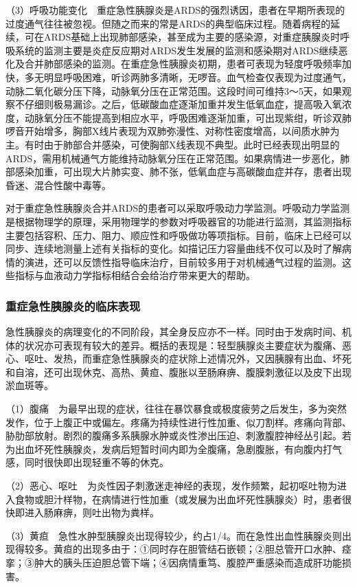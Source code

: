 （3）呼吸功能变化　重症急性胰腺炎是ARDS的强烈诱因，患者在早期所表现的过度通气往往被忽视。但随之而来的常是ARDS的典型临床过程。随着病程的延续，可在ARDS基础上出现肺部感染，甚至成为主要的感染源，对重症胰腺炎时呼吸系统的监测主要是炎症反应期对ARDS发生发展的监测和感染期对ARDS继续恶化及合并肺部感染的监测。在重症急性胰腺炎初期，患者可表现为轻度呼吸频率加快，多无明显呼吸困难，听诊两肺多清晰，无啰音。血气检查仅表现为过度通气，动脉二氧化碳分压下降，动脉氧分压在正常范围。这段时间可维持3～5天，如果观察不仔细则极易漏诊。之后，低碳酸血症逐渐加重并发生低氧血症，提高吸入氧浓度，动脉氧分压不能提高到相应水平，呼吸困难逐渐加重，可出现紫绀，听诊双肺啰音开始增多，胸部X线片表现为双肺弥漫性、对称性密度增高，以间质水肿为主。有时由于肺部合并感染，可使胸部X线表现不典型。此时已经表现出明显的ARDS，需用机械通气方能维持动脉氧分压在正常范围。如果病情进一步恶化，肺部感染加重，可出现大片肺实变、肺不张，低氧血症与高碳酸血症并存，患者出现昏迷、混合性酸中毒等。

对于重症急性胰腺炎合并ARDS的患者可以采取呼吸动力学监测。呼吸动力学监测是根据物理学的原理，采用物理学的参数对呼吸器官的功能进行监测，其监测指标主要包括容积、压力、阻力、顺应性和呼吸做功等项指标。目前，临床上已经可以同步、连续地测量上述有关指标的变化。如描记压力容量曲线不仅可以及时了解病情的演进，还可以反馈性指导临床治疗，目前较多用于对机械通气过程的监测。这些指标与血液动力学指标相结合会给治疗带来更大的帮助。

\subsubsection{重症急性胰腺炎的临床表现}

急性胰腺炎的病理变化的不同阶段，其全身反应亦不一样。同时由于发病时间、机体的状况亦可表现有较大的差异。概括的表现是：轻型胰腺炎主要症状为腹痛、恶心、呕吐、发热，而重症急性胰腺炎的症状除上述情况外，又因胰腺有出血、坏死和自溶，还可出现休克、高热、黄疸、腹胀以至肠麻痹、腹膜刺激征以及皮下出现淤血斑等。

（1）腹痛　为最早出现的症状，往往在暴饮暴食或极度疲劳之后发生，多为突然发作，位于上腹正中或偏左。疼痛为持续性进行性加重、似刀割样。疼痛向背部、胁肋部放射。剧烈的腹痛多系胰腺水肿或炎性渗出压迫、刺激腹腔神经丛引起。若为出血坏死性胰腺炎，发病后短暂时间内即为全腹痛，急剧腹胀，有向腹内打气感，同时很快即出现轻重不等的休克。

（2）恶心、呕吐　为炎性因子刺激迷走神经的表现，发作频繁，起初呕吐物为进入食物或胆汁样物，在病情进行性加重（或发展为出血坏死性胰腺炎）时，患者很快即进入肠麻痹，则吐出物为粪样。

（3）黄疸　急性水肿型胰腺炎出现得较少，约占1/4。而在急性出血性胰腺炎则出现得较多。黄疸的出现多由于：①同时存在胆管结石嵌顿；②胆总管开口水肿、痉挛；③肿大的胰头压迫胆总管下端；④因病情重笃、腹腔严重感染而造成肝功能损害。

